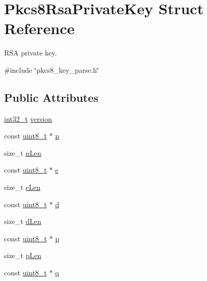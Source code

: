 \hypertarget{structPkcs8RsaPrivateKey}{}\section{Pkcs8\+Rsa\+Private\+Key Struct Reference}
\label{structPkcs8RsaPrivateKey}


R\+SA private key.  




{\ttfamily \#include \char`\"{}pkcs8\+\_\+key\+\_\+parse.\+h\char`\"{}}

\subsection*{Public Attributes}
\begin{DoxyCompactItemize}
\item 
\hyperlink{stdint_8h_ab1967d8591af1a4e48c37fd2b0f184d0}{int32\+\_\+t} \hyperlink{structPkcs8RsaPrivateKey_aef9252c5a9c491f2d555bcc72cc5dd3a}{version}
\item 
const \hyperlink{stdint_8h_aba7bc1797add20fe3efdf37ced1182c5}{uint8\+\_\+t} $\ast$ \hyperlink{structPkcs8RsaPrivateKey_ae7d21db6f648db24b15e7903df25f46f}{n}
\item 
size\+\_\+t \hyperlink{structPkcs8RsaPrivateKey_a947768dc9001e1987637b0270bbd0459}{n\+Len}
\item 
const \hyperlink{stdint_8h_aba7bc1797add20fe3efdf37ced1182c5}{uint8\+\_\+t} $\ast$ \hyperlink{structPkcs8RsaPrivateKey_a2946cc6004722d2074d3b267e97daef8}{e}
\item 
size\+\_\+t \hyperlink{structPkcs8RsaPrivateKey_a899452f1ccd061c9ff81517a441b3299}{e\+Len}
\item 
const \hyperlink{stdint_8h_aba7bc1797add20fe3efdf37ced1182c5}{uint8\+\_\+t} $\ast$ \hyperlink{structPkcs8RsaPrivateKey_a011925e3908af99efcc106424aed7498}{d}
\item 
size\+\_\+t \hyperlink{structPkcs8RsaPrivateKey_a20dba37d8944eaa4f0384e092490a05a}{d\+Len}
\item 
const \hyperlink{stdint_8h_aba7bc1797add20fe3efdf37ced1182c5}{uint8\+\_\+t} $\ast$ \hyperlink{structPkcs8RsaPrivateKey_ae62dece22d7f28257445b4b5a3a4f200}{p}
\item 
size\+\_\+t \hyperlink{structPkcs8RsaPrivateKey_a90ceb269ed09aad82e4ef4b6cfd269df}{p\+Len}
\item 
const \hyperlink{stdint_8h_aba7bc1797add20fe3efdf37ced1182c5}{uint8\+\_\+t} $\ast$ \hyperlink{structPkcs8RsaPrivateKey_a129f4bc46975ed98556bc42c75151782}{q}

\end{DoxyCompactItemize}
